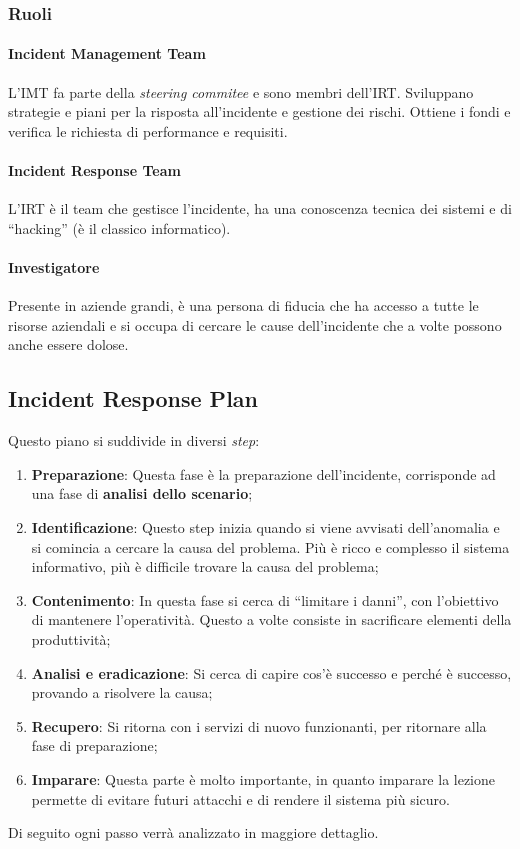 \subsubsection{Ruoli}

\paragraph*{Incident Management Team} L'IMT fa parte della \textit{steering
commitee} e sono membri dell'IRT. Sviluppano strategie e piani per la risposta
all'incidente e gestione dei rischi. Ottiene i fondi e verifica le richiesta
di performance e requisiti.

\paragraph*{Incident Response Team} L'IRT è il
team che gestisce l'incidente, ha una conoscenza tecnica dei sistemi e di
``hacking'' (è il classico informatico).

\paragraph*{Investigatore} Presente in aziende grandi, è una persona di fiducia
che ha accesso a tutte le risorse aziendali e si occupa di cercare le cause
dell'incidente che a volte possono anche essere dolose.



\subsection{Incident Response Plan}

Questo piano si suddivide in diversi \textit{step}:
\begin{enumerate}
\item \textbf{Preparazione}: Questa fase è la preparazione dell'incidente,
corrisponde ad una fase di \textbf{analisi dello scenario};

\item \textbf{Identificazione}: Questo step inizia quando si viene
avvisati dell'anomalia e si comincia a cercare la causa del problema.
Più è ricco e complesso il sistema informativo, più è difficile trovare
la causa del problema;

\item \textbf{Contenimento}: In questa fase si cerca di ``limitare i
danni'', con l'obiettivo di mantenere l'operatività. Questo a volte
consiste in  sacrificare elementi della produttività;

\item \textbf{Analisi e eradicazione}: Si cerca di capire cos'è successo
e perché è successo, provando a risolvere la causa;

\item \textbf{Recupero}: Si ritorna con i servizi di nuovo funzionanti,
per ritornare alla fase di preparazione;

\item \textbf{Imparare}:  Questa parte è molto importante, in quanto
imparare la lezione permette di evitare futuri attacchi e di rendere il
sistema più sicuro.

\end{enumerate}

Di seguito ogni passo verrà analizzato in maggiore dettaglio.
